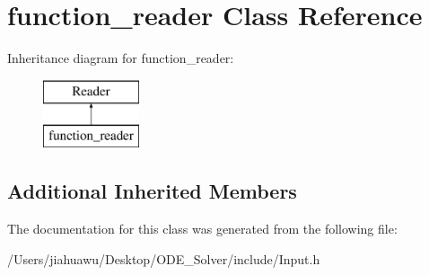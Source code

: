 \hypertarget{classfunction__reader}{}\section{function\+\_\+reader Class Reference}
\label{classfunction__reader}
Inheritance diagram for function\+\_\+reader\+:\begin{figure}[H]
\begin{center}
\leavevmode
\includegraphics[height=2.000000cm]{classfunction__reader}
\end{center}
\end{figure}
\subsection*{Additional Inherited Members}


The documentation for this class was generated from the following file\+:\begin{DoxyCompactItemize}
\item 
/\+Users/jiahuawu/\+Desktop/\+O\+D\+E\+\_\+\+Solver/include/Input.\+h\end{DoxyCompactItemize}
